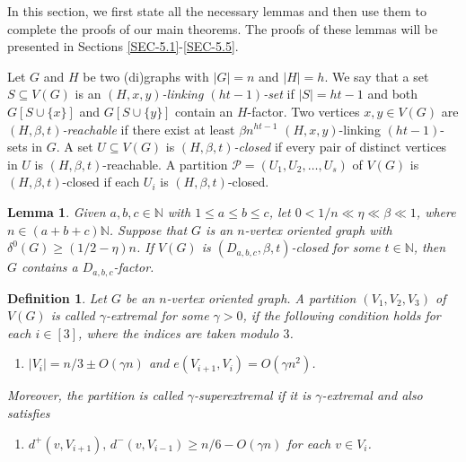\documentclass[11pt,a4paper,reqno]{amsart}
\newtheorem{definition}{Definition}
\newtheorem{lemma}[theorem]{Lemma}
\theoremstyle{definition} %
\begin{document}
In this section, we first state all the necessary lemmas and then use them to complete the proofs of our main theorems. The proofs of these lemmas will be presented in Sections \ref{SEC-5.1}-\ref{SEC-5.5}.



Let $G$ and $H$ be two (di)graphs with $|G|=n$ and $|H|=h$. We say that a set $S\subseteq V(G)$ is an \emph{$(H,x,y)$-linking $(ht-1)$-set} if $|S|=ht-1$ and both $G[S\cup\{x\}]$ and $G[S\cup\{y\}]$ contain an $H$-factor. Two vertices $x,y\in V(G)$ are \emph{$(H,\beta,t)$-reachable} if there exist at least $\beta n^{ht-1}$ $(H,x,y)$-linking $(ht-1)$-sets in $G$. A set $U\subseteq V(G)$ is \emph{$(H,\beta,t)$-closed} if every pair of distinct vertices in $U$ is $(H,\beta,t)$-reachable. A partition $\mathcal{P}=(U_1,U_2,\ldots,U_s)$ of $V(G)$ is $(H,\beta,t)$-closed if each $U_i$ is $(H,\beta,t)$-closed.

\begin{lemma}\label{LEM:closed-factor}
Given $a,b,c\in \mathbb{N}$ with $1\leqslant a\leqslant b\leqslant c$, let
$0<1/n \ll \eta \ll \beta \ll 1$, where $n\in (a+b+c)\mathbb{N}$.
Suppose that $G$ is an $n$-vertex oriented graph with
$\delta^0(G)\geqslant (1/2-\eta)n$.
If $V(G)$ is $(D_{a,b,c},\beta,t)$-closed for some $t\in\mathbb{N}$, then
$G$ contains a $D_{a,b,c}$-factor.
\end{lemma}  


 \begin{definition}\label{DEF:extremal}
Let $G$ be an $n$-vertex oriented graph. A partition $(V_1,V_2,V_3)$ of $V(G)$ is called \emph{$\gamma$-extremal} for some $\gamma>0$, if the following condition holds for each $i\in[3]$, where the indices are taken modulo $3$.
\begin{enumerate}[label=\upshape \textbf{(EP\arabic{enumi})},ref=\upshape (EP\arabic{enumi}),series=mylist]
    \setlength{\itemindent}{1.5em}
    \item $|V_i|=n/3\pm O(\gamma n)$ and $e(V_{i+1},V_i)=O(\gamma n^2)$.\label{EP1}
\end{enumerate}
Moreover, the partition is called \emph{$\gamma$-superextremal} if it is $\gamma$-extremal and also satisfies
\begin{enumerate}[label=\upshape \textbf{(EP\arabic{enumi})},ref=\upshape (EP\arabic{enumi}),resume=mylist]
    \setlength{\itemindent}{1.5em}
    \item $d^+(v,V_{i+1}),\,d^-(v,V_{i-1})\geqslant n/6-O(\gamma n)$ for each $v\in V_i$.\label{EP2}
\end{enumerate}
\end{definition}
\end{document}
